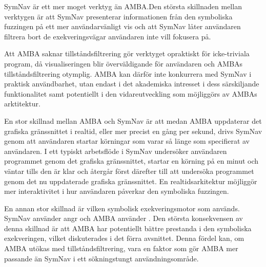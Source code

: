 SymNav är ett mer moget verktyg än AMBA.\@ Den största skillnaden mellan verktygen
är att SymNav presenterar informationen från den symboliska fuzzingen på ett mer
användarvänligt vis och att SymNav låter användaren filtrera bort de
exekveringsvägar användaren inte vill fokusera på.

Att AMBA saknar tillståndsfiltrering gör verktyget opraktiskt för icke-triviala
program, då visualiseringen blir överväldigande för användaren och AMBAs
tillståndsfiltrering otymplig. AMBA kan därför inte konkurrera med SymNav i
praktisk användbarhet, utan endast i det akademiska intresset i dess
särskiljande funktionalitet samt potentiellt i den vidareutveckling som
möjliggörs av AMBAs arktitektur.

En stor skillnad mellan AMBA och SymNav är att medan AMBA uppdaterar det
grafiska gränssnittet i realtid, eller mer precist en gång per sekund, drivs
SymNav genom att användaren startar körningar som varar så länge som specifierat
av användaren. I ett typiskt arbetsflöde i SymNav undersöker användaren
programmet genom det grafiska gränssnittet, startar en körning på en minut och
väntar tills den är klar och återgår först därefter till att undersöka
programmet genom det nu uppdaterade grafiska gränssnittet. En realtidsarkitektur
möjliggör mer interaktivitet i hur användaren påverkar den symboliska fuzzingen.

En annan stor skillnad är vilken symbolisk exekveringsmotor som används. SymNav
använder angr och AMBA använder \stoe{}. Den största konsekvensen av denna
skillnad är att AMBA har potentiellt bättre prestanda i den symboliska
exekveringen, vilket diskuterades i det förra avsnittet. Denna fördel kan, om
AMBA utökas med tillståndsfiltrering, vara en faktor som gör AMBA mer passande
än SymNav i ett sökningstungt användningsområde.
